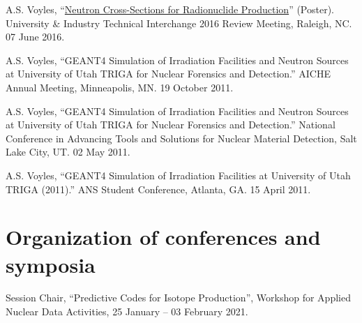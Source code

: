 \begin{bibsection}
\item A.S. Voyles, \enquote{\href{https://github.com/avoyles/posters/blob/master/2016-06-07-UITI/Voyles_UITI2016_Poster_OsloUpdate.pdf}{Neutron Cross-Sections for Radionuclide Production}} (Poster).  University \& Industry Technical Interchange 2016 Review Meeting, Raleigh, NC. 07 June 2016.

\item A.S. Voyles, \enquote{GEANT4 Simulation of Irradiation Facilities and Neutron Sources at University of Utah TRIGA for
Nuclear Forensics and Detection.}  AICHE Annual Meeting, Minneapolis, MN. 19 October 2011.

\item A.S. Voyles, \enquote{GEANT4 Simulation of Irradiation Facilities and Neutron Sources at University of Utah TRIGA for
Nuclear Forensics and Detection.}   National Conference in Advancing Tools and Solutions for
Nuclear Material Detection, Salt Lake City, UT. 02 May 2011.

\item A.S. Voyles, \enquote{GEANT4 Simulation of Irradiation Facilities at University of Utah TRIGA (2011).} 
ANS Student Conference, Atlanta, GA. 15 April 2011.

\end{bibsection}


\section{\sc Organization of conferences and symposia}

\begin{list2}


\item Session Chair, \enquote{Predictive Codes for Isotope Production}, Workshop for Applied Nuclear Data Activities,  25 January -- 03 February 2021.

\end{list2}
